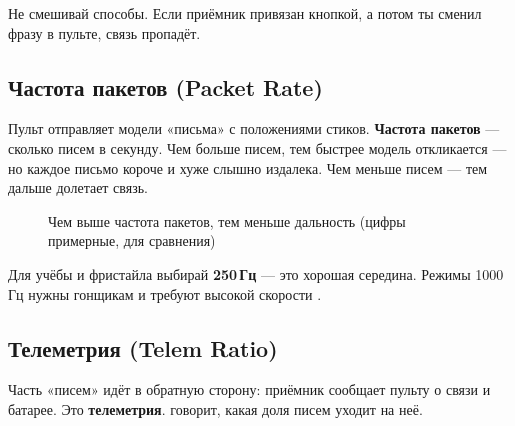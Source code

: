 \begin{caution}
Не смешивай способы. Если приёмник привязан кнопкой, а потом ты сменил фразу в пульте,
связь пропадёт.
\end{caution}

\subsection{Частота пакетов (Packet Rate)}

\begin{simple}
Пульт отправляет модели «письма» с положениями стиков. \textbf{Частота пакетов} --- сколько
писем в секунду. Чем больше писем, тем быстрее модель откликается --- но каждое письмо
короче и хуже слышно издалека. Чем меньше писем --- тем дальше долетает связь.
\end{simple}

\begin{figure}[H]
\centering
{}
\caption{Чем выше частота пакетов, тем меньше дальность (цифры примерные, для сравнения)}
\end{figure}

Для учёбы и фристайла выбирай \textbf{250\,Гц} --- это хорошая середина. Режимы 1000\,Гц нужны
гонщикам и требуют высокой скорости .

\subsection{Телеметрия (Telem Ratio)}

Часть «писем» идёт в обратную сторону: приёмник сообщает пульту о связи и батарее. Это
\textbf{телеметрия}.  говорит, какая доля писем уходит на неё.

